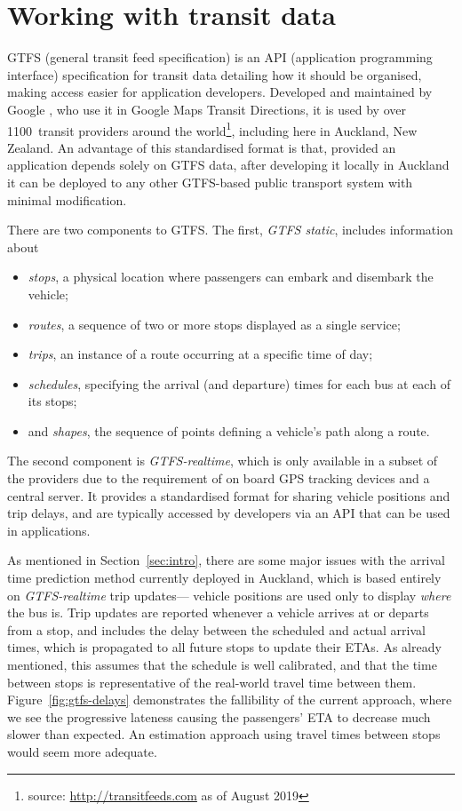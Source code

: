 \section{Working with \rt transit data}
\label{sec:gtfs}

GTFS (general transit feed specification)
is an API (application programming interface) specification for transit data
detailing how it should be organised,
making access easier for application developers.
Developed and maintained by Google \citep{GoogleDevelopers_2006},
who use it in Google Maps Transit Directions,
it is used by over 1100~transit providers around the world\footnote{%
source: \url{http://transitfeeds.com} as of August 2019},
including here in Auckland, New Zealand.
An advantage of this standardised format is that,
provided an application depends solely on GTFS data,
after developing it locally in Auckland it can be deployed to any other GTFS-based
public transport system with minimal modification.


There are two components to GTFS.
The first, \emph{GTFS static}, includes information about
\begin{itemize}
\item \emph{stops}, a physical location where passengers can embark and disembark the vehicle;
\item \emph{routes}, a sequence of two or more stops displayed as a single service;
\item \emph{trips}, an instance of a route occurring at a specific time of day;
\item \emph{schedules}, specifying the arrival (and departure) times for each bus at each of its stops; 
\item and \emph{shapes}, the sequence of points defining a vehicle's path along a route.
\end{itemize}
The second component is \emph{GTFS-realtime},
which is only available in a subset of the providers due to the requirement of 
on board GPS tracking devices and a central server.
It provides a standardised format for sharing vehicle positions and trip delays,
and are typically accessed by developers via an API that can be used in \rt applications.

As mentioned in Section~\ref{sec:intro},
there are some major issues with the arrival time prediction method currently
deployed in Auckland,
which is based entirely on \emph{GTFS-realtime} trip updates---%
vehicle positions are used only to display \emph{where} the bus is.
Trip updates are reported whenever a vehicle arrives at or departs from a stop,
and includes the delay between the scheduled and actual arrival times,
which is propagated to all future stops to update their ETAs.
As already mentioned, this assumes that the schedule is well calibrated,
and that the time between stops
is representative of the real-world travel time between them. 
Figure~\ref{fig:gtfs-delays} demonstrates the fallibility of the current approach,
where we see the progressive lateness causing the passengers' ETA to 
decrease much slower than expected.
An estimation approach using \rt travel times 
between stops would seem more adequate.



